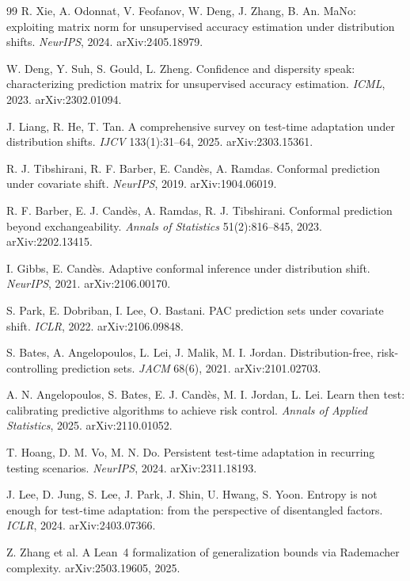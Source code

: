 \begin{thebibliography}{99}
 R. Xie, A. Odonnat, V. Feofanov, W. Deng, J. Zhang, B. An.
MaNo: exploiting matrix norm for unsupervised accuracy estimation under distribution
shifts. \emph{NeurIPS}, 2024. arXiv:2405.18979.

 W. Deng, Y. Suh, S. Gould, L. Zheng. Confidence and
dispersity speak: characterizing prediction matrix for unsupervised accuracy estimation.
\emph{ICML}, 2023. arXiv:2302.01094.

 J. Liang, R. He, T. Tan. A comprehensive survey on
test-time adaptation under distribution shifts. \emph{IJCV} 133(1):31--64, 2025.
arXiv:2303.15361.

 R. J. Tibshirani, R. F. Barber, E. Cand\`es,
A. Ramdas. Conformal prediction under covariate shift. \emph{NeurIPS}, 2019.
arXiv:1904.06019.

 R. F. Barber, E. J. Cand\`es, A. Ramdas, R. J. Tibshirani.
Conformal prediction beyond exchangeability. \emph{Annals of Statistics}
51(2):816--845, 2023. arXiv:2202.13415.

 I. Gibbs, E. Cand\`es. Adaptive conformal inference under
distribution shift. \emph{NeurIPS}, 2021. arXiv:2106.00170.

 S. Park, E. Dobriban, I. Lee, O. Bastani. PAC prediction sets
under covariate shift. \emph{ICLR}, 2022. arXiv:2106.09848.

 S. Bates, A. Angelopoulos, L. Lei, J. Malik, M. I. Jordan.
Distribution-free, risk-controlling prediction sets. \emph{JACM} 68(6), 2021.
arXiv:2101.02703.

 A. N. Angelopoulos, S. Bates, E. J. Cand\`es,
M. I. Jordan, L. Lei. Learn then test: calibrating predictive algorithms to achieve
risk control. \emph{Annals of Applied Statistics}, 2025. arXiv:2110.01052.

 T. Hoang, D. M. Vo, M. N. Do. Persistent test-time adaptation
in recurring testing scenarios. \emph{NeurIPS}, 2024. arXiv:2311.18193.

 J. Lee, D. Jung, S. Lee, J. Park, J. Shin, U. Hwang, S. Yoon.
Entropy is not enough for test-time adaptation: from the perspective of disentangled
factors. \emph{ICLR}, 2024. arXiv:2403.07366.

 Z. Zhang et al. A Lean~4 formalization of
generalization bounds via Rademacher complexity. arXiv:2503.19605, 2025.


\end{thebibliography}
